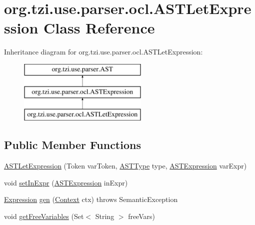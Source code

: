 \hypertarget{classorg_1_1tzi_1_1use_1_1parser_1_1ocl_1_1_a_s_t_let_expression}{\section{org.\-tzi.\-use.\-parser.\-ocl.\-A\-S\-T\-Let\-Expression Class Reference}
\label{classorg_1_1tzi_1_1use_1_1parser_1_1ocl_1_1_a_s_t_let_expression}
}
Inheritance diagram for org.\-tzi.\-use.\-parser.\-ocl.\-A\-S\-T\-Let\-Expression\-:\begin{figure}[H]
\begin{center}
\leavevmode
\includegraphics[height=3.000000cm]{classorg_1_1tzi_1_1use_1_1parser_1_1ocl_1_1_a_s_t_let_expression}
\end{center}
\end{figure}
\subsection*{Public Member Functions}
\begin{DoxyCompactItemize}
\item 
\hyperlink{classorg_1_1tzi_1_1use_1_1parser_1_1ocl_1_1_a_s_t_let_expression_a5985e127d0a7693a35d3640c47c87923}{A\-S\-T\-Let\-Expression} (Token var\-Token, \hyperlink{classorg_1_1tzi_1_1use_1_1parser_1_1ocl_1_1_a_s_t_type}{A\-S\-T\-Type} type, \hyperlink{classorg_1_1tzi_1_1use_1_1parser_1_1ocl_1_1_a_s_t_expression}{A\-S\-T\-Expression} var\-Expr)
\item 
void \hyperlink{classorg_1_1tzi_1_1use_1_1parser_1_1ocl_1_1_a_s_t_let_expression_a5bb3bdc8b612dad37877edec5f82eeab}{set\-In\-Expr} (\hyperlink{classorg_1_1tzi_1_1use_1_1parser_1_1ocl_1_1_a_s_t_expression}{A\-S\-T\-Expression} in\-Expr)
\item 
\hyperlink{classorg_1_1tzi_1_1use_1_1uml_1_1ocl_1_1expr_1_1_expression}{Expression} \hyperlink{classorg_1_1tzi_1_1use_1_1parser_1_1ocl_1_1_a_s_t_let_expression_a3aabad2229bb7e199b48e822c7fb077a}{gen} (\hyperlink{classorg_1_1tzi_1_1use_1_1parser_1_1_context}{Context} ctx)  throws Semantic\-Exception 
\item 
void \hyperlink{classorg_1_1tzi_1_1use_1_1parser_1_1ocl_1_1_a_s_t_let_expression_a26c1185e72455285b8a675d80695f7eb}{get\-Free\-Variables} (Set$<$ String $>$ free\-Vars)
\end{DoxyCompactItemize}
